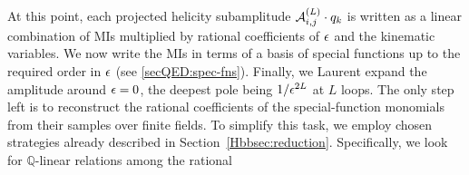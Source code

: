 \documentclass[main.tex]{subfiles}
\begin{document}
At this point, each projected helicity subamplitude $\mathcal{A}^{(L)}_{i,j}\cdot q_k$
is written as a linear combination of MIs multiplied by rational
coefficients of $\epsilon$ and the kinematic variables. We now write the MIs
in terms of a basis of special functions up to the required order in $\epsilon$
(see \cref{secQED:spec-fns}). Finally, we Laurent expand the amplitude around
$\epsilon=0$, the deepest pole being $1/\epsilon^{2 L}$ at $L$ loops. The only step
left is to reconstruct the rational coefficients of the special-function
monomials from their samples over finite fields. To simplify this task, we employ chosen strategies already described in Section~\ref{Hbbsec:reduction}.
Specifically, we look for $\mathbb{Q}$-linear relations among the rational
\end{document}
